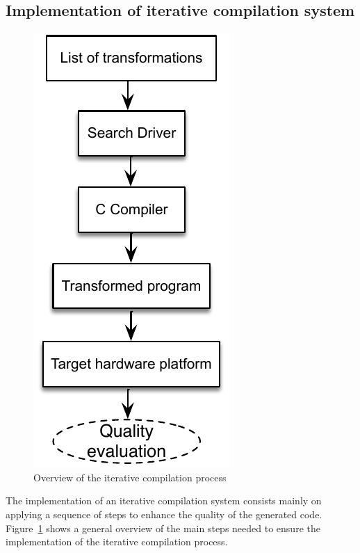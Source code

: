 \subsection{Implementation of iterative compilation system}
\begin{figure}[h]
	\center
	\includegraphics[scale=0.65]{SOTA/fig/iterative_compilation}
	\caption{Overview of the iterative compilation process}
	\label{fig:iterative_compilation}
\end{figure}
The implementation of an iterative compilation system consists mainly on applying a sequence of steps to enhance the quality of the generated code. Figure~\ref{fig:iterative_compilation} shows a general overview of the main steps needed to ensure the implementation of the iterative compilation process.
